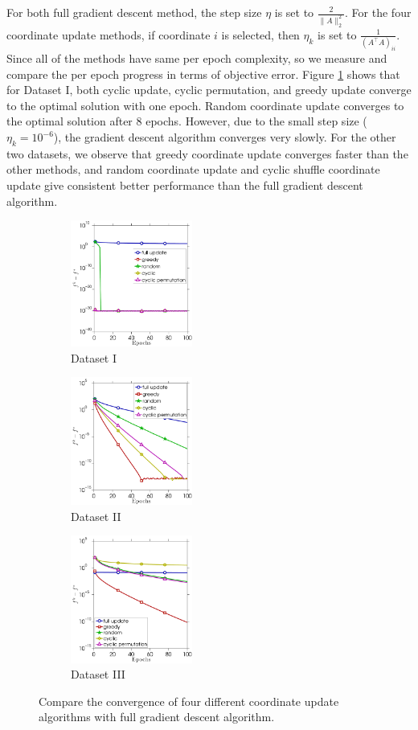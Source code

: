 {{For both full gradient descent method, the step size $\eta$ is set to $\frac{2}{\|A\|_2^2}$. For the four coordinate update methods, if coordinate $i$ is selected, then $\eta_k$ is set to $\frac{1}{(A^{\top}A)_{ii}}$. Since all of the methods have same per epoch complexity, so we measure and compare the per epoch progress in terms of objective error. Figure \ref{fig:ls_a} shows that for Dataset I, both cyclic update, cyclic permutation, and greedy update converge to the optimal solution with one epoch. Random coordinate update converges to the optimal solution after $8$ epochs. However, due to the small step size ($\eta_k = 10^{-6}$), the gradient descent algorithm converges very slowly. For the other two datasets, we observe that greedy coordinate update converges faster than the other methods, and random coordinate update and cyclic shuffle coordinate update give consistent better performance than the full gradient descent algorithm.
\begin{figure}[!htbp] \centering
    \begin{subfigure}[b]{0.3\linewidth}
        \includegraphics[width=40mm]{./figs/diag_matrix_cropped.pdf}
        \caption{Dataset I}
        \label{fig:ls_a}
    \end{subfigure} %
    \quad
    \begin{subfigure}[b]{0.3\linewidth}
        \includegraphics[width=40mm]{./figs/randn_matrix_cropped.pdf}
        \caption{Dataset II}
        \label{fig:ls_b}
    \end{subfigure} %
    \quad
    \begin{subfigure}[b]{0.3\linewidth}
        \includegraphics[width=40mm]{./figs/rand_matrix_cropped.pdf}
        \caption{Dataset III}
        \label{fig:ls_c}
    \end{subfigure} %
    \caption{Compare the convergence of four different coordinate update algorithms with full gradient descent algorithm.}
    \label{fig:3s_results}
\end{figure}
}
}

